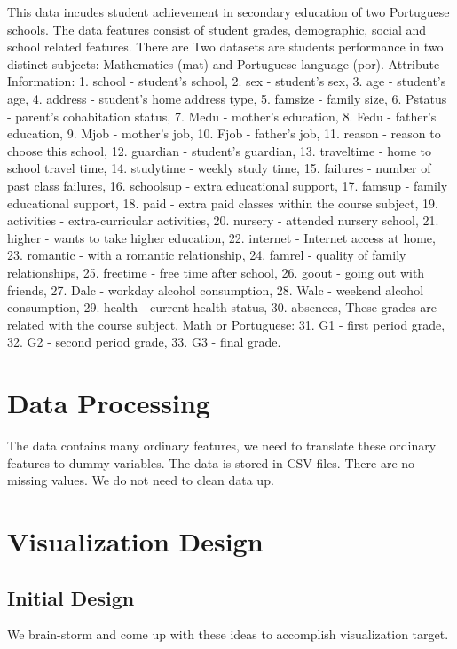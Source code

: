 \documentclass{article}
\begin{document}
This data incudes student achievement in secondary education of two Portuguese schools. The data features consist of student grades, demographic, social and school related features. There are Two datasets are students performance in two distinct subjects: Mathematics (mat) and Portuguese language (por). Attribute Information: 
1. school - student's school, 
2. sex - student's sex,
3. age - student's age, 
4. address - student's home address type, 
5. famsize - family size, 
6. Pstatus - parent's cohabitation status, 
7. Medu - mother's education,
8. Fedu - father's education,
9. Mjob - mother's job, 
10. Fjob - father's job, 
11. reason - reason to choose this school, 
12. guardian - student's guardian, 
13. traveltime - home to school travel time,
14. studytime - weekly study time, 
15. failures - number of past class failures, 
16. schoolsup - extra educational support, 
17. famsup - family educational support,
18. paid - extra paid classes within the course subject, 
19. activities - extra-curricular activities,
20. nursery - attended nursery school, 
21. higher - wants to take higher education, 
22. internet - Internet access at home, 
23. romantic - with a romantic relationship, 
24. famrel - quality of family relationships, 
25. freetime - free time after school, 
26. goout - going out with friends,
27. Dalc - workday alcohol consumption, 
28. Walc - weekend alcohol consumption, 
29. health - current health status, 
30. absences, 
These grades are related with the course subject, Math or Portuguese: 
31. G1 - first period grade, 
32. G2 - second period grade, 
33. G3 - final grade. 
\section{Data Processing}
The data contains many ordinary features, we need to translate these ordinary features to dummy variables. The data is stored in CSV files. There are no missing values. We do not need to clean data up.
\section{Visualization Design}
\subsection{Initial Design}
We brain-storm and come up with these ideas to accomplish visualization target.
\end{document}
